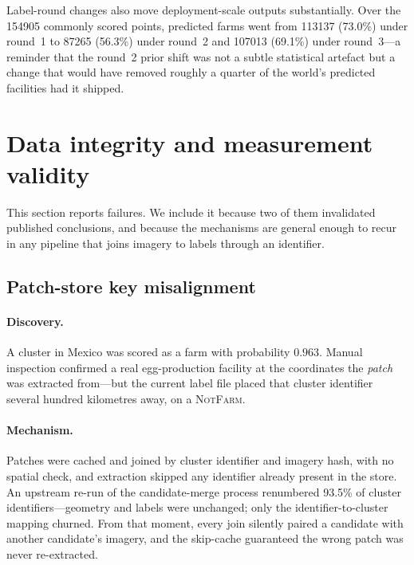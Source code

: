 \documentclass[11pt,a4paper]{article}
\begin{document}
Label-round changes also move deployment-scale outputs substantially. Over the
\num{154905} commonly scored points, predicted farms went from \num{113137}
(73.0\%) under round~1 to \num{87265} (56.3\%) under round~2 and \num{107013}
(69.1\%) under round~3---a reminder that the round~2 prior shift was not a
subtle statistical artefact but a change that would have removed roughly a
quarter of the world's predicted facilities had it shipped.

\section{Data integrity and measurement validity}
\label{sec:validity}

This section reports failures. We include it because two of them invalidated
published conclusions, and because the mechanisms are general enough to recur in
any pipeline that joins imagery to labels through an identifier.

\subsection{Patch-store key misalignment}
\label{sec:geofix}

\paragraph{Discovery.} A cluster in Mexico was scored as a farm with probability
$0.963$. Manual inspection confirmed a real egg-production facility at the
coordinates the \emph{patch} was extracted from---but the current label file
placed that cluster identifier several hundred kilometres away, on a
\textsc{NotFarm}.

\paragraph{Mechanism.} Patches were cached and joined by cluster identifier and
imagery hash, with no spatial check, and extraction skipped any identifier
already present in the store. An upstream re-run of the candidate-merge process
renumbered 93.5\% of cluster identifiers---geometry and labels were unchanged;
only the identifier-to-cluster mapping churned. From that moment, every join
silently paired a candidate with another candidate's imagery, and the skip-cache
guaranteed the wrong patch was never re-extracted.
\end{document}
